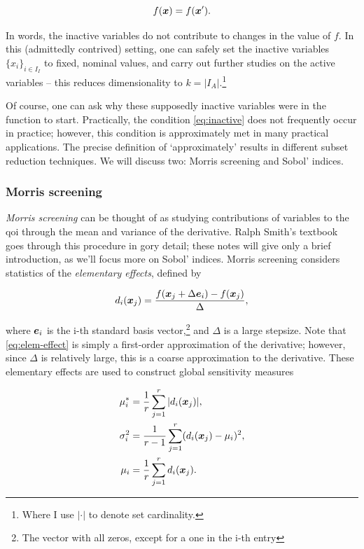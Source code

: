 \documentclass{article}
\begin{document}
\begin{equation} \label{eq:inactive}
  f(\boldsymbol{x}) = f(\boldsymbol{x}').
\end{equation}

\noindent In words, the inactive variables do not contribute to changes in the
value of $f$. In this (admittedly contrived) setting, one can safely set the
inactive variables $\{x_i\}_{i\in I_I}$ to fixed, nominal values, and carry out
further studies on the active variables -- this reduces dimensionality to $k =
|I_A|$.\footnote{Where I use $|\cdot|$ to denote set cardinality.}

Of course, one can ask why these supposedly inactive variables were in the
function to start. Practically, the condition \eqref{eq:inactive} does not
frequently occur in practice; however, this condition is approximately met in
many practical applications. The precise definition of `approximately' results
in different subset reduction techniques. We will discuss two: Morris screening
and Sobol' indices.

\subsubsection{Morris screening}
\emph{Morris screening} can be thought of as studying contributions of variables
to the qoi through the mean and variance of the derivative. Ralph Smith's
textbook \cite{smith2013uncertainty} goes through this procedure in gory detail;
these notes will give only a brief introduction, as we'll focus more on Sobol'
indices. Morris screening considers statistics of the \emph{elementary effects},
defined by

\begin{equation}\label{eq:elem-effect}
  d_{i}(\boldsymbol{x}_j) = \frac{f(\boldsymbol{x}_j+\Delta \boldsymbol{e}_i) - f(\boldsymbol{x}_j)}{\Delta},
\end{equation}

\noindent where \(\boldsymbol{e}_i\) is the i-th standard basis vector,\footnote{The vector with
all zeros, except for a one in the i-th entry} and \(\Delta\) is a large stepsize.
Note that \eqref{eq:elem-effect} is simply a first-order approximation of the
derivative; however, since \(\Delta\) is relatively large, this is a coarse
approximation to the derivative. These elementary effects are used to construct
global sensitivity measures

\begin{equation}\begin{aligned}
  \mu_i^* &= \frac{1}{r}\sum_{j=1}^r |d_{i}(\boldsymbol{x}_j)|, \\
  \sigma_i^2 &= \frac{1}{r-1}\sum_{j=1}^r(d_{i}(\boldsymbol{x}_j)-\mu_i)^2, \\
  \mu_i &= \frac{1}{r}\sum_{j=1}^rd_{i}(\boldsymbol{x}_j).
\end{aligned}\end{equation}
\end{document}
